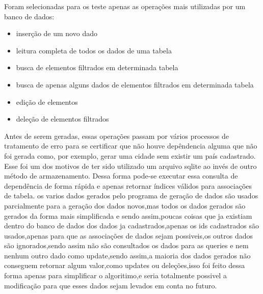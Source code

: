 \documentclass[
	12pt,				%
	openright,			%
	oneside,			%
	a4paper,			%
	english,			%
	french,				%
	spanish,			%
	brazil,				%
	]{abntex2}
\begin{document}
Foram selecionadas para os teste apenas as operações mais utilizadas por um banco de dados:
\begin{itemize}
\item inserção de um novo dado
\item leitura completa de todos os dados de uma tabela
\item busca de elementos filtrados em determinada tabela
\item busca de apenas alguns dados de elementos filtrados em determinada tabela
\item edição de elementos
\item deleção de elementos filtrados
\end{itemize}
Antes de serem geradas, essas operações passam por vários processos de tratamento de erro para se certificar que não houve depêndencia alguma que não foi gerada como, por exemplo, gerar uma cidade sem existir um país cadastrado. Esse foi um dos motivos de ter sido utilizado um arquivo sqlite ao invés de outro método de armazenamento. Dessa forma pode-se executar essa consulta de dependência de forma rápida e apenas retornar índices válidos para associações de tabela.
os varios dados gerados pelo programa de geração de dados são usados parcialmente para a geração dos dados novos,mas todos os dados gerados são gerados da forma mais simplificada e sendo assim,poucas coisas que ja existiam dentro do banco de dados dos dados ja cadastrados,apenas os ids cadastrados são usados,apenas para que as associações de dados sejam possiveis,os outros dados são ignorados,sendo assim não são consultados os dados para as queries e nem nenhum outro dado como update,sendo assim,a maioria dos dados gerados não conseguem retornar algum valor,como updates ou deleções,isso foi feito dessa forma apenas para simplificar o algoritimo,e seria totalmente possivel a modificação para que esses dados sejam levados em conta no futuro.
\end{document}
